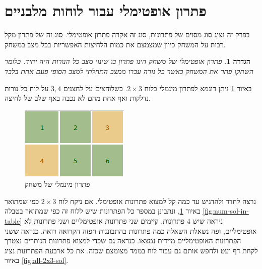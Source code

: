\documentclass[12pt,leqno]{article}
\theoremstyle{theoremdd}
\newtheorem{definition}{הגדרה}
\begin{document}
\section{פתרון אופטימלי עבור לוחות מלבניים}
בפרק זה נציג סוג מסוים של פתרונות,
סוג זה אקרה פתרון אופטימלי.
סוג זה של פתרון מקל רבות על המשחק 
כיוון שמצמצם את כמות הלחיצות האפשריות בכל מצב במשחק.
\begin{definition}
    \label{def: opt-sol}
    פתרון אופטימלי של משחק הינו פתרון 
    בו שינוי מצב כל הנורות 
    היה יחיד.
    כלומר 
    השחקן פתר את המשחק כאשר 
    כל נורה עברו ממצב התחלתי למצב הסופי פעם אחת בלבד
\end{definition}
באיור 
\ref{fig: min sol 2x3}
ניתן דוגמא לפתרון מינמלי 
בלוח 
$2 \times 3$.
כשלוחצים על לחצנים 
$3, 4$
על לוח כל נורות נדלקות ואף 
אחת מהם לא נכבה באף שלב של לחיצה.

\begin{figure}[ht]
    \caption{פתרון מינמלי של משחק}
    \label{fig: min sol 2x3}
    \centering
    \includegraphics[width=.3\textwidth,keepaspectratio]{images/min_sol_2x3.PNG}
\end{figure}

נרצה לחדד ולהדגיש עד כמה קל למצוא פתרונות אופטימלי.
אם ניקח לוח 
$2 \times 3$
כפי שמתואר 
באיור 
\ref{fig: min sol 2x3},
ונתבונן במספר כל הפתרונות שיש ללוח זה
כפי
שמתואר בטבלה 
\ref{fig:num-sol-in-table}
ניראה שיש 
$4$
פתרונות.
קיימים שני פתרונות אופטימליים 
ושני פתרונות לא אופטימליים,
ופה נשאלת השאלה כמה פתרונות בהתבוננות חפזה הקרואה רואה.
כנראה ששני הפתרונות האופטימליים מיידית נמצאו. כנראה גם שכדי למצוא פתרונות הנותרים 
נצטרך לקחת דף ועט ולחפש אותם גם עבור לוח בממד מצומצם שכזה.
את כל ארבעת הפתרונות נציג באיור 
\ref{fig:all-2x3-sol}.
\end{document}
